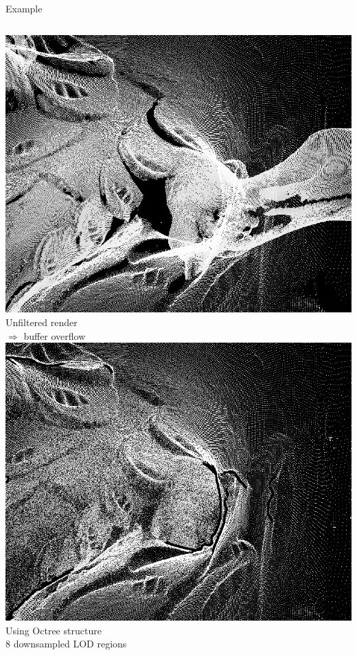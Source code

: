 \documentclass{beamer}
\begin{document}
\begin{frame}{Example}
	\begin{columns}[t|t]
		\includegraphics[width=\textwidth]{dir.png} \\
		Unfiltered render \\
		$\Rightarrow$ buffer overflow
		\includegraphics[width=\textwidth]{str.png} \\
		Using Octree structure \\
		8 downsampled LOD regions
	\end{columns}
\end{frame}
\end{document}
